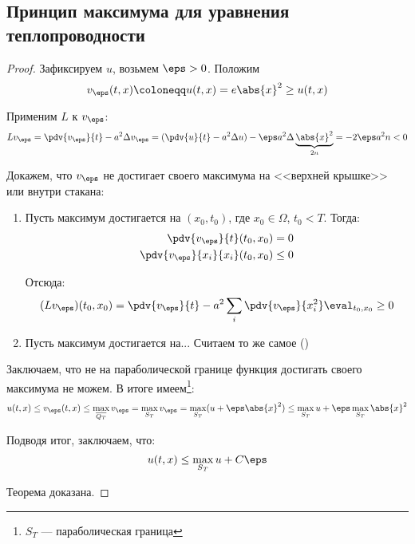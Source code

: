
\setcounter{subsection}{4}

\subsection{Принцип максимума для уравнения теплопроводности}


\begin{proof}
  Зафиксируем $u$, возьмем $\eps > 0$. Положим
  \begin{equation}
    v_\eps(t, x) \coloneqq u(t, x) = e \abs{x}^2 \ge u(t, x)
  \end{equation}
  
  Применим $L$ к $v_\eps$:
  \begin{equation}
    Lv_\eps = \pdv{v_\eps}{t} - a^2 \Delta v_\eps = (\pdv{u}{t} - a^2 \Delta u) - \eps a^2 \Delta \underbrace{\abs{x}^2}_{2n} = -2\eps a^2 n < 0
  \end{equation}
  
  Докажем, что $v_\eps$ не достигает своего максимума на <<верхней крышке>> или внутри стакана:
  
  \begin{enumerate}
    \item Пусть максимум достигается на $(x_0, t_0)$, где $x_0 \in \Omega$, $t_0 < T$. Тогда:
    \begin{align}
      \pdv{v_\eps}{t}(t_0, x_0) &= 0 \\
      \pdv{v_\eps}{x_i}{x_i}(t_0, x_0) &\le 0
    \end{align}
    
    Отсюда:
    \begin{equation}
      (Lv_\eps)(t_0, x_0) = \pdv{v_\eps}{t} - a^2 \sum_i \pdv{v_\eps}{x_i^2} \eval_{t_0, x_0} \ge 0
    \end{equation}
    
    \item Пусть максимум достигается на...  Считаем то же самое ()
  \end{enumerate}

  Заключаем, что не на параболической границе функция достигать своего максимума не можем. В итоге имеем\footnote{$S_T$ --- параболическая граница}:
  \begin{equation}
    u(t, x) \le v_\eps(t, x) \le \max_{\overline{Q_T}} v_\eps = \max_{S_T} v_\eps = \max_{S_T} (u + \eps\abs{x}^2) \le \max_{S_T} u + \eps \max_{S_T} \abs{x}^2
  \end{equation}
  
  Подводя итог, заключаем, что:
  \begin{equation}
    u(t, x) \le \max_{S_T} u + C\eps
  \end{equation}
  
  Теорема доказана.
\end{proof}

